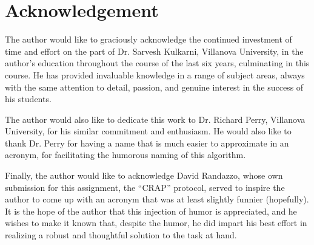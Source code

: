 \section*{Acknowledgement}
The author would like to graciously acknowledge the continued investment of time and effort on the part of Dr. Sarvesh Kulkarni, Villanova University, in the author's education throughout the course of the last six years, culminating in this course. He has provided invaluable knowledge in a range of subject areas, always with the same attention to detail, passion, and genuine interest in the success of his students. 

The author would also like to dedicate this work to Dr. Richard Perry, Villanova University, for his similar commitment and enthusiasm. He would also like to thank Dr. Perry for having a name that is much easier to approximate in an acronym, for facilitating the humorous naming of this algorithm. 

Finally, the author would like to acknowledge David Randazzo, whose own submission for this assignment, the ``CRAP'' protocol, served to inspire the author to come up with an acronym that was at least slightly funnier (hopefully). It is the hope of the author that this injection of humor is appreciated, and he wishes to make it known that, despite the humor, he did impart his best effort in realizing a robust and thoughtful solution to the task at hand.